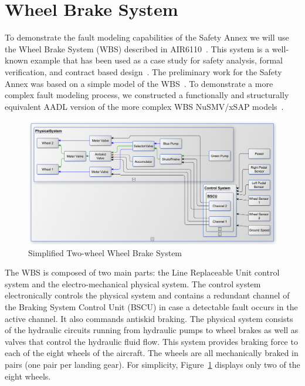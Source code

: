 \section{Wheel Brake System}
\label{sec:wbs}
To demonstrate the fault modeling capabilities of the Safety Annex we will use the Wheel Brake System (WBS) described in AIR6110~\cite{AIR6110}.  This system is a well-known example that has been used as a case study for safety analysis, formal verification, and contract based design~\cite{DBLP:conf/cav/BozzanoCPJKPRT15, 10.1007/978-3-319-11936-6-7, CAV2015:BoCiGrMa, Joshi05:SafeComp}. The preliminary work for the Safety Annex was based on a simple model of the WBS~\cite{Stewart17:IMBSA}. To demonstrate a more complex fault modeling process, we constructed a functionally and structurally equivalent AADL version of the more complex WBS NuSMV/xSAP models~\cite{DBLP:conf/cav/BozzanoCPJKPRT15}.    

\begin{figure}[htbp]
	\centering
	\includegraphics[trim=0 9 0 5,clip,width=\textwidth]{images/wbs_arch4_diagram.pdf}
	\caption{Simplified Two-wheel Wheel Brake System}
	\label{fig:wbs}
\end{figure} 

The WBS is composed of two main parts: the Line Replaceable Unit control system and the electro-mechanical physical system.
The control system electronically controls the physical system and contains a redundant
channel of the Braking System Control Unit (BSCU) in case a detectable fault occurs in the active channel.
 It also commands antiskid braking. %
 The physical system consists of the hydraulic circuits running from hydraulic pumps to wheel brakes as well as valves that control the hydraulic fluid flow. This system provides braking force to each of the eight wheels of the aircraft. The wheels are all mechanically braked in pairs (one pair per landing gear). For simplicity, Figure~\ref{fig:wbs} displays only two of the eight wheels. 

